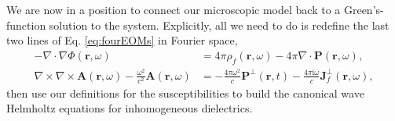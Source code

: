 We are now in a position to connect our microscopic model back to a Green's-function solution to the system. Explicitly, all we need to do is redefine the last two lines of Eq. \eqref{eq:fourEOMs} in Fourier space,
\begin{equation}
\begin{split}
-\nabla\cdot\nabla\Phi(\mathbf{r},\omega) &= 4\pi\rho_f(\mathbf{r},\omega) - 4\pi\nabla\cdot\mathbf{P}(\mathbf{r},\omega),\\
\nabla\times\nabla\times\mathbf{A}(\mathbf{r},\omega) - \frac{\omega^2}{c^2}\mathbf{A}(\mathbf{r},\omega) &= -\frac{4\pi\omega^2}{c}\mathbf{P}^\perp(\mathbf{r},t) - \frac{4\pi\mathrm{i}\omega}{c}\mathbf{J}_f^\perp(\mathbf{r},\omega),
\end{split}
\end{equation}
then use our definitions for the susceptibilities to build the canonical wave Helmholtz equations for inhomogeneous dielectrics. 
